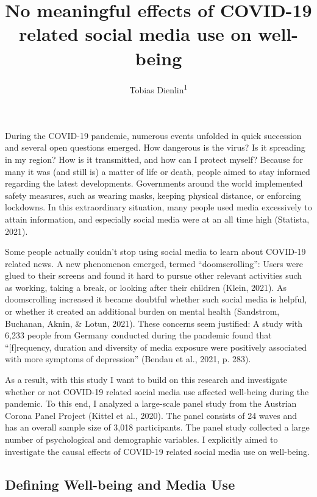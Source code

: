 \documentclass[
  english,
  man,floatsintext]{apa6}
\title{No meaningful effects of COVID-19 related social media use on well-being}
\author{Tobias Dienlin\textsuperscript{1}}
\date{}
\affiliation{\vspace{0.5cm}\textsuperscript{1} University of Vienna}
\begin{document}
\maketitle

During the COVID-19 pandemic,
numerous events unfolded in quick succession and several open questions emerged.
How dangerous is the virus?
Is it spreading in my region?
How is it transmitted, and how can I protect myself?
Because for many it was (and still is) a matter of life or death, people aimed to stay informed regarding the latest developments.
Governments around the world implemented safety measures, such as wearing masks, keeping physical distance, or enforcing lockdowns.
In this extraordinary situation, many people used media excessively to attain information, and especially social media were at an all time high (Statista, 2021).

Some people actually couldn't stop using social media to learn about COVID-19 related news.
A new phenomenon emerged, termed ``doomscrolling'':
Users were glued to their screens and found it hard to pursue other relevant activities such as working, taking a break, or looking after their children (Klein, 2021).
As doomscrolling increased it became doubtful whether such social media is helpful, or whether it created an additional burden on mental health (Sandstrom, Buchanan, Aknin, \& Lotun, 2021).
These concerns seem justified:
A study with 6,233 people from Germany conducted during the pandemic found that ``{[}f{]}requency, duration and diversity of media exposure were positively associated with more symptoms of depression'' (Bendau et al., 2021, p. 283).

As a result, with this study I want to build on this research and investigate whether or not COVID-19 related social media use affected well-being during the pandemic.
To this end, I analyzed a large-scale panel study from the Austrian Corona Panel Project (Kittel et al., 2020).
The panel consists of 24 waves and has an overall sample size of 3,018 participants.
The panel study collected a large number of psychological and demographic variables.
I explicitly aimed to investigate the causal effects of COVID-19 related social media use on well-being.

\hypertarget{defining-well-being-and-media-use}{%
\subsection{Defining Well-being and Media Use}\label{defining-well-being-and-media-use}}
\end{document}
